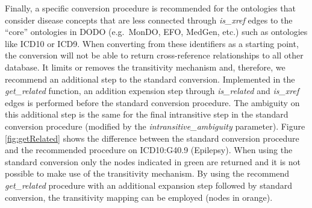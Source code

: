 \documentclass[9pt,a4paper,]{extarticle}
\begin{document}
Finally, a specific conversion procedure is recommended for the ontologies that consider disease concepts that are less connected through \emph{is\_xref} edges to the ``core'' ontologies in DODO (e.g.~MonDO, EFO, MedGen, etc.) such as ontologies like ICD10 or ICD9. When converting from these identifiers as a starting point, the conversion will not be able to return cross-reference relationships to all other database. It limits or removes the transitivity mechanism and, therefore, we recommend an additional step to the standard conversion. Implemented in the \emph{get\_related} function, an addition expension step through \emph{is\_related} and \emph{is\_xref} edges is performed before the standard conversion procedure. The ambiguity on this additional step is the same for the final intransitive step in the standard conversion procedure (modified by the \emph{intransitive\_ambiguity} parameter). Figure \ref{fig:getRelated} shows the difference between the standard conversion procedure and the recommended procedure on ICD10:G40.9 (Epilepsy). When using the standard conversion only the nodes indicated in green are returned and it is not possible to make use of the transitivity mechanism. By using the recommend \emph{get\_related} procedure with an additional expansion step followed by standard conversion, the transitivity mapping can be employed (nodes in orange).
\end{document}
